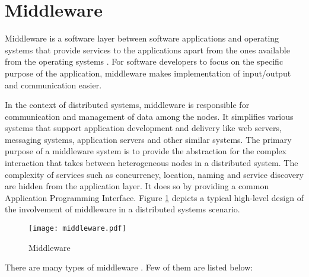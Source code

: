 \section{Middleware}

Middleware is a software layer between software applications and operating systems that provide services to the applications apart from the ones available from the operating systems \parencite{middleware_wiki}. For software developers to focus on the specific purpose of the application, middleware makes implementation of input/output and communication easier.



In the context of distributed systems, middleware is responsible for communication and management of data among the nodes. It simplifies various systems that support application development and delivery like web servers, messaging systems, application servers and other similar systems. The primary purpose of a middleware system is to provide the abstraction for the complex interaction that takes between heterogeneous nodes in a distributed system. The complexity of services such as concurrency, location, naming and service discovery are hidden from the application layer. It does so by providing a common Application Programming  Interface. Figure \ref{figures:middleware} depicts a typical high-level design of the involvement of middleware in a distributed systems scenario.

\makeatletter
\setlength{\@fptop}{0pt}
\makeatother

\begin{figure}[t!]
\centering
\def\svgwidth{.8\textwidth}
\texttt{[image: middleware.pdf]}
\caption{Middleware}\label{figures:middleware}
\end{figure}

There are many types of middleware \parencite{middleware_types}. Few of them are listed below:

